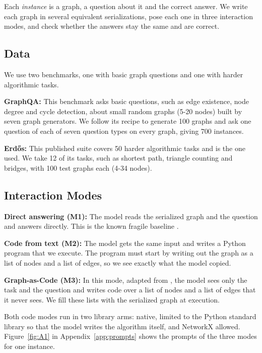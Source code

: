 \documentclass[11pt]{article}
\begin{document}
Each \emph{instance} is a graph, a question about it and the correct answer. We write each graph in several equivalent serializations, pose each one in three interaction modes, and check whether the answers stay the same and are correct.

\subsection{Data}

We use two benchmarks, one with basic graph questions and one with harder algorithmic tasks.

\textbf{GraphQA:} This benchmark \citep{fatemi} asks basic questions, such as edge existence, node degree and cycle detection, about small random graphs (5-20 nodes) built by seven graph generators. We follow its recipe to generate 100 graphs and ask one question of each of seven question types on every graph, giving 700 instances.

\textbf{Erdős:} This published suite \citep{guo} covers 50 harder algorithmic tasks and is the one \citet{herbst} used. We take 12 of its tasks, such as shortest path, triangle counting and bridges, with 100 test graphs each (4-34 nodes).

\subsection{Interaction Modes}\label{sec:modes}

\textbf{Direct answering (M1):} The model reads the serialized graph and the question and answers directly. This is the known fragile baseline \citep{herbst}.

\textbf{Code from text (M2):} The model gets the same input and writes a Python program that we execute. The program must start by writing out the graph as a list of nodes and a list of edges, so we see exactly what the model copied.

\textbf{Graph-as-Code (M3):} In this mode, adapted from \citet{finkelshtein}, the model sees only the task and the question and writes code over a list of nodes and a list of edges that it never sees. We fill these lists with the serialized graph at execution.

Both code modes run in two library arms: native, limited to the Python standard library so that the model writes the algorithm itself, and NetworkX allowed. Figure~\ref{fig:A1} in Appendix~\ref{app:prompts} shows the prompts of the three modes for one instance.
\end{document}
